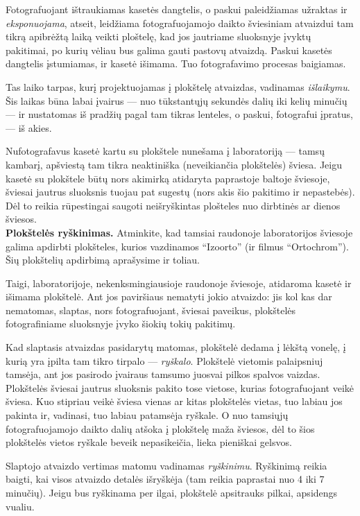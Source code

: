 \documentclass[12pt]{book}
\begin{document}
			Fotografuojant ištraukiamas kasetės dangtelis, o paskui paleidžiamas užraktas ir \textit{eksponuojama}, atseit, leidžiama fotografuojamojo daikto šviesiniam atvaizdui tam tikrą apibrėžtą laiką veikti ploštelę, kad jos jautriame sluoksnyje įvyktų pakitimai, po kurių vėliau bus galima gauti pastovų atvaizdą. Paskui kasetės dangtelis įstumiamas, ir kasetė išimama. Tuo fotografavimo procesas baigiamas.

			Tas laiko tarpas, kurį projektuojamas į plokštelę atvaizdas, vadinamas \textit{išlaikymu}. Šis laikas būna labai įvairus --- nuo tūkstantųjų sekundės dalių iki kelių minučių --- ir nustatomas iš pradžių pagal tam tikras lenteles, o paskui, fotografui įpratus, --- iš akies.

			Nufotografavus kasetė kartu su plokštele nunešama į laboratoriją --- tamsų kambarį, apšviestą tam tikra neaktiniška (neveikiančia plokštelės) šviesa. Jeigu kasetė su plokštele būtų nors akimirką atidaryta paprastoje baltoje šviesoje, šviesai jautrus sluoksnis tuojau pat sugestų (nors akis šio pakitimo ir nepastebės). Dėl to reikia rūpestingai saugoti neišryškintas plošteles nuo dirbtinės ar dienos šviesos.\\

			\textbf{Plokštelės ryškinimas.} Atminkite, kad tamsiai raudonoje laboratorijos šviesoje galima apdirbti plokšteles, kurios vazdinamos ``Izoorto'' (ir filmus ``Ortochrom''). Šių plokštelių apdirbimą aprašysime ir toliau.

			Taigi, laboratorijoje, nekenksmingiausioje raudonoje šviesoje, atidaroma kasetė ir išimama plokštelė. Ant jos paviršiaus nematyti jokio atvaizdo: jis kol kas dar nematomas, slaptas, nors fotografuojant, šviesai paveikus, plokštelės fotografiniame sluoksnyje įvyko šiokių tokių pakitimų.

			Kad slaptasis atvaizdas pasidarytų matomas, plokštelė dedama į lėkštą vonelę, į kurią yra įpilta tam tikro tirpalo --- \textit{ryškalo}. Plokštelė vietomis palaipsniuj tamsėja, ant jos pasirodo įvairaus tamsumo juosvai pilkos spalvos vaizdas. Plokštelės šviesai jautrus sluoksnis pakito tose vietose, kurias fotografuojant veikė šviesa. Kuo stipriau veikė šviesa vienas ar kitas plokštelės vietas, tuo labiau jos pakinta ir, vadinasi, tuo labiau patamsėja ryškale. O nuo tamsiųjų fotografuojamojo daikto dalių atšoka į plokštelę maža šviesos, dėl to šios plokštelės vietos  ryškale beveik nepasikeičia, lieka pieniškai gelsvos.

			Slaptojo atvaizdo vertimas matomu vadinamas \textit{ryškinimu}. Ryškinimą reikia baigti, kai visos atvaizdo detalės išryškėja (tam reikia paprastai nuo 4 iki 7 minučių). Jeigu bus ryškinama per ilgai, plokštelė apsitrauks pilkai, apsidengs vualiu.
\end{document}
